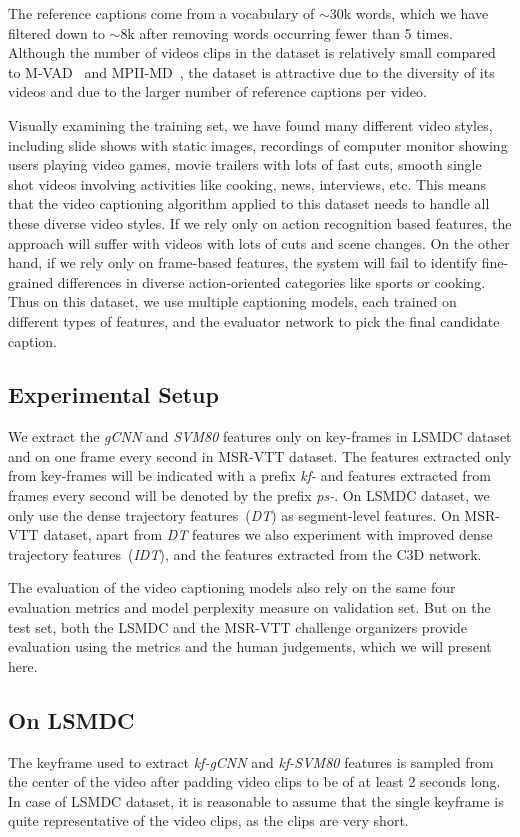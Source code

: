 The reference captions come from a vocabulary of $\sim$30k words, which we have
filtered down to $\sim$8k after removing words occurring fewer than 5 times.
Although the number of videos clips in the dataset is relatively small compared
to M-VAD~\cite{rohrbach15cvpr} and MPII-MD~\cite{AtorabiM-VAD2015}, the dataset
is attractive due to the diversity of its videos and due to the larger number of
reference captions per video.

Visually examining the training set, we have found many different video styles,
including slide shows with static images, recordings of computer monitor showing
users playing video games, movie trailers with lots of fast cuts, smooth single
shot videos involving activities like cooking, news, interviews, etc.
This means that the video captioning algorithm applied to this dataset needs to
handle all these diverse video styles.
If we rely only on action recognition based features, the approach will suffer
with videos with lots of cuts and scene changes.
On the other hand, if we rely only on frame-based features, the system will fail
to identify fine-grained differences in diverse action-oriented categories like
sports or cooking.
Thus on this dataset, we use multiple captioning models, each trained on
different types of features, and the evaluator network to pick the final
candidate caption.
\subsection{Experimental Setup}
We extract the \emph{gCNN} and \emph{SVM80} features only on key-frames in LSMDC
dataset and on one frame every second in MSR-VTT dataset.
The features extracted only from key-frames will be indicated with a prefix
\emph{kf-} and features extracted from frames every second will be denoted by
the prefix \emph{ps-}.
On LSMDC dataset, we only use the dense trajectory features~(\emph{DT}) as
segment-level features.
On MSR-VTT dataset, apart from \emph{DT} features we also experiment with
improved dense trajectory features~(\emph{IDT}), and the features extracted from
the C3D network.

The evaluation of the video captioning models also rely on the same four
evaluation metrics and model perplexity measure on validation set. 
But on the test set, both the LSMDC and the MSR-VTT challenge organizers provide
evaluation using the metrics and the human judgements, which we will present
here.

\subsection{On LSMDC}
The keyframe used to extract \emph{kf-gCNN} and \emph{kf-SVM80} features is
sampled from the center of the video after padding video clips to be of at least
2 seconds long.
In case of LSMDC dataset, it is reasonable to assume that the single keyframe is
quite representative of the video clips, as the clips are very short.

